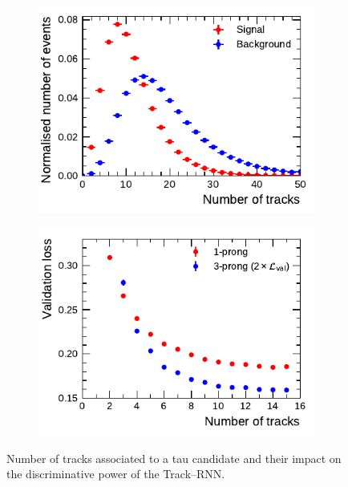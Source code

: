 \begin{figure}[htb]
  \begin{subfigure}[t]{0.48\textwidth}
    \centering
    \includegraphics{./figures/rnn/ntrk_1p.pdf}
    \label{fig:ntracks_tau}
  \end{subfigure}\hfill
  \begin{subfigure}[t]{0.48\textwidth}
    \centering
    \includegraphics{./figures/rnn/nscan/track_1p_3p.pdf}
    \label{fig:ntracks_loss}
  \end{subfigure}
  \caption{Number of tracks associated to a tau candidate and their impact on
    the discriminative power of the Track--RNN.}
  \label{fig:rnn_ntracks}
\end{figure}

